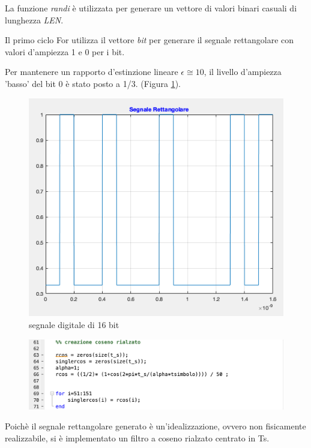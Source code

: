 \documentclass[12pt, a4paper]{article}
\begin{document}
La funzione \textit{randi} è utilizzata per generare un vettore di valori binari casuali di lunghezza \textit{LEN}.

Il primo ciclo For utilizza il vettore \textit{bit} per generare il segnale rettangolare con valori d'ampiezza 1 e 0 per i bit.

Per mantenere un rapporto d'estinzione lineare $\epsilon \cong 10$, il livello d'ampiezza 'basso' del bit 0 è stato posto a 1/3. (Figura \ref{dig_sig}).

  \begin{figure}[h!]
  \centering
  \includegraphics[scale = 0.6]{digsig.png}
  \caption{segnale digitale di 16 bit}
  \label{dig_sig}
  \end{figure}


\newpage
\begin{figure}[h!]
\centering
\includegraphics[scale=0.4]{cosenorialzato.png}
\caption{}
\label{6}
\end{figure}

Poichè il segnale rettangolare generato è un'idealizzazione, ovvero non fisicamente realizzabile, si è implementato un filtro a coseno rialzato centrato in Ts.
\end{document}
